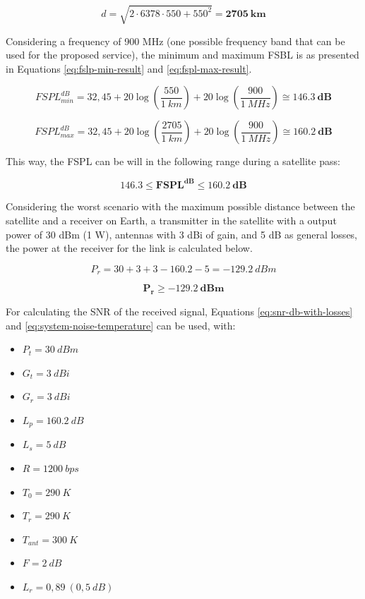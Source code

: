 \begin{equation} \label{eq:horizon-distance-result}
d = \sqrt{2\cdot 6378\cdot 550 + 550^{2}} = \mathbf{2705\ km}
\end{equation}

Considering a frequency of 900 MHz (one possible frequency band that can be used for the proposed service), the minimum and maximum FSBL is as presented in Equations \ref{eq:fslp-min-result} and \ref{eq:fspl-max-result}.

\begin{equation} \label{eq:fslp-min-result}
    FSPL^{dB}_{min} = 32,45 + 20\log\left(\frac{550}{1\ km}\right) + 20\log\left(\frac{900}{1\ MHz}\right) \cong \mathbf{146.3\ dB}
\end{equation}

\begin{equation} \label{eq:fspl-max-result}
    FSPL^{dB}_{max} = 32,45 + 20\log\left(\frac{2705}{1\ km}\right) + 20\log\left(\frac{900}{1\ MHz}\right) \cong \mathbf{160.2\ dB}
\end{equation}

This way, the FSPL can be will in the following range during a satellite pass:

\begin{equation}
    \mathbf{146.3 \leq FSPL^{dB} \leq 160.2\ dB}
\end{equation}

Considering the worst scenario with the maximum possible distance between the satellite and a receiver on Earth, a transmitter in the satellite with a output power of 30 dBm (1 W), antennas with 3 dBi of gain, and 5 dB as general losses, the power at the receiver for the link is calculated below.

\begin{equation}
    P_{r} = 30 + 3 + 3 - 160.2 - 5 = -129.2\ dBm
\end{equation}

\begin{equation}
    \mathbf{P_{r} \geq -129.2\ dBm}
\end{equation}

For calculating the SNR of the received signal, Equations \ref{eq:snr-db-with-losses} and \ref{eq:system-noise-temperature} can be used, with:

\begin{itemize}
    \item $P_{t} = 30\ dBm$
    \item $G_{t} = 3\ dBi$
    \item $G_{r} = 3\ dBi$
    \item $L_{p} = 160.2\ dB$
    \item $L_{s} = 5\ dB$
    \item $R = 1200\ bps$
    \item $T_{0} = 290\ K$
    \item $T_{r} = 290\ K$
    \item $T_{ant} = 300\ K$
    \item $F = 2\ dB$
    \item $L_{r} = 0,89\ (0,5\ dB)$
\end{itemize}

